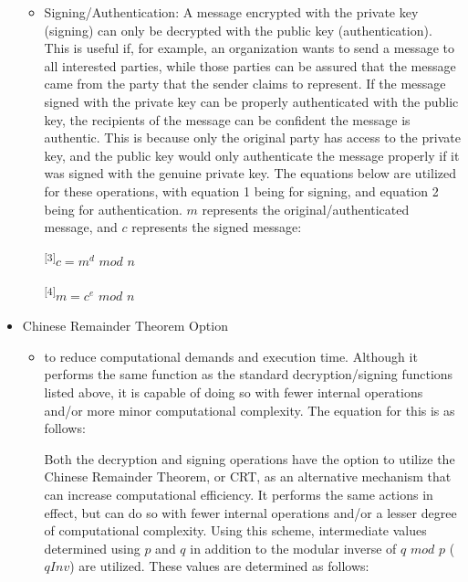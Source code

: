 \documentclass[11pt]{article}
\begin{document}
\begin{itemize}
{\begin{itemize}
{\begin{itemize}
{\textsuperscript{[1]}$c = m^e$ $mod$ $n$

\textsuperscript{[2]}$m = c^d$ $mod$ $n$
\newline
		}
		\item
		{
		Signing/Authentication: A message encrypted with the private key (signing) can only be decrypted with the public key (authentication). This is useful if, for example, an organization wants to send a message to all interested parties, while those parties can be assured that the message came from the party that the sender claims to represent. If the  message signed with the private key can be properly authenticated with the public key, the recipients of the message can be confident the message is authentic. This is because only the original party has access to the private key, and the public key would only authenticate the message properly if it was signed with the genuine private key. The equations below are utilized for these operations, with equation 1 being for signing, and equation 2 being for authentication. $m$ represents the original/authenticated message, and $c$ represents the signed message:\newline

\textsuperscript{[3]}$c = m^d$ $mod$ $n$

\textsuperscript{[4]}$m = c^e$ $mod$ $n$
\newline
		}
		\end{itemize}
	}
	\end{itemize}
}
\item
{Chinese Remainder Theorem Option
	\begin{itemize}
	\item
	{ to reduce computational demands and execution time. Although it performs the same function as the standard decryption/signing functions listed above, it is capable of doing so with fewer internal operations and/or more minor computational complexity. The equation for this is as follows:
	
	Both the decryption and signing operations have the option to utilize the Chinese Remainder Theorem, or CRT, as an alternative mechanism that can increase computational efficiency. It performs the same actions in effect, but can do so with fewer internal operations and/or a lesser degree of computational complexity. Using this scheme, intermediate values determined using $p$ and $q$ in addition to the modular inverse of $q$ $mod$ $p$ ($qInv$) are utilized. These values are determined as follows:\newline

}
\end{itemize}}
\end{itemize}
\end{document}
